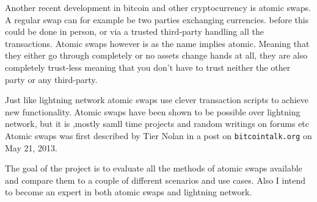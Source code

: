 Another recent development in bitcoin and other cryptocurrency is atomic swaps. A regular swap can for example be two parties exchanging currencies. before this could be done in person, or via a trusted third-party handling all the transactions. Atomic swaps however is as the name implies atomic. Meaning that they either go through completely or no assets change hands at all, they are also completely trust-less meaning that you don't have to trust neither the other party or any third-party.

Just like lightning network atomic swaps use clever transaction scripts to achieve new functionality. Atomic swaps have been shown to be possible over lightning network, but it is ,mostly samll time projects and random writings on forums etc
Atomic swaps was first described by Tier Nolan in a post on \texttt{bitcointalk.org} on May 21, 2013.\cite{tier_nolan}


The goal of the project is to evaluate all the methods of atomic swaps available and compare them to a couple of different scenarios and use cases. Also I intend to become an expert in both atomic swaps and lightning network. 

